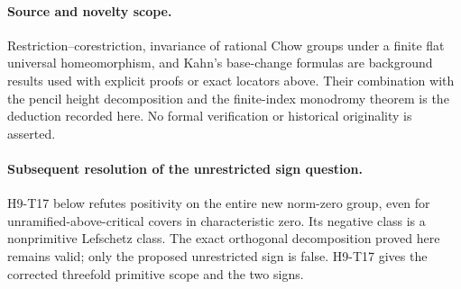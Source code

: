 \paragraph{Source and novelty scope.}
Restriction--corestriction, invariance of rational Chow groups under a
finite flat universal homeomorphism, and Kahn's base-change formulas
are background results used with explicit proofs or exact locators
above. Their combination with the pencil height decomposition and
the finite-index monodromy theorem is the deduction recorded here.
No formal verification or historical originality is asserted.

\paragraph{Subsequent resolution of the unrestricted sign question.}
H9-T17 below refutes positivity on the entire new norm-zero group, even
for unramified-above-critical covers in characteristic zero. Its negative
class is a nonprimitive Lefschetz class. The exact orthogonal decomposition
proved here remains valid; only the proposed unrestricted sign is false.
H9-T17 gives the corrected threefold primitive scope and the two signs.

